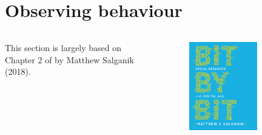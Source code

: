 \documentclass[serif, aspectratio=169]{beamer}
\title{\doctitle} %
\author{
\large
\textsc{Francesco Bailo}\\[2mm] 
\normalsize The University of Sydney \\
}
\date{27 Mar 2024}
\begin{document}
{
\begin{frame}
  \titlepage
\end{frame}
}
\addtocounter{framenumber}{-1}

\frame{\tableofcontents}


\section{Observing behaviour}

\begin{frame}

\begin{columns}
\begin{column}{0.4\textwidth}

This section is largely based on Chapter 2 of  by Matthew Salganik (2018).

\end{column}

\begin{column}{0.6\textwidth}

\begin{figure}

\includegraphics[width=0.7\textwidth]{figure/9780691158648.png}

\end{figure}

\end{column}
\end{columns}

\end{frame}
\end{document}
